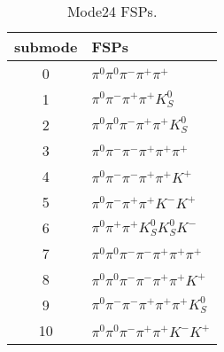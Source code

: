 \begin{table}[h!]
\begin{center}
\begin{tabular}{cl}
\hline
submode& FSPs\\
\hline
0 & $\pi^0 \pi^0 \pi^- \pi^+ \pi^+ $ \\
1 & $\pi^0 \pi^- \pi^+ \pi^+ K_S^0 $ \\
2 & $\pi^0 \pi^0 \pi^- \pi^+ \pi^+ K_S^0 $ \\
3 & $\pi^0 \pi^- \pi^- \pi^+ \pi^+ \pi^+ $ \\
4 & $\pi^0 \pi^- \pi^- \pi^+ \pi^+ K^+ $ \\
5 & $\pi^0 \pi^- \pi^+ \pi^+ K^- K^+ $ \\
6 & $\pi^0 \pi^+ \pi^+ K_S^0 K_S^0 K^- $ \\
7 & $\pi^0 \pi^0 \pi^- \pi^- \pi^+ \pi^+ \pi^+ $ \\
8 & $\pi^0 \pi^0 \pi^- \pi^- \pi^+ \pi^+ K^+ $ \\
9 & $\pi^0 \pi^- \pi^- \pi^+ \pi^+ \pi^+ K_S^0 $ \\
10 & $\pi^0 \pi^0 \pi^- \pi^+ \pi^+ K^- K^+ $ \\
\hline
\end{tabular}
\label{tab:Mode24FSPs}
\caption{Mode24 FSPs.}
\end{center}
\end{table}
